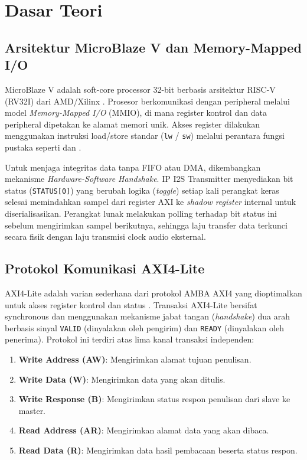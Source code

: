 \section{Dasar Teori}

\subsection{Arsitektur MicroBlaze V dan Memory-Mapped I/O}

MicroBlaze V adalah soft-core processor 32-bit berbasis arsitektur RISC-V (RV32I) dari AMD/Xilinx \citep{xilinx_microblaze_ref_2021}. Prosesor berkomunikasi dengan peripheral melalui model \textit{Memory-Mapped I/O} (MMIO), di mana register kontrol dan data peripheral dipetakan ke alamat memori unik. Akses register dilakukan menggunakan instruksi load/store standar (\texttt{lw} / \texttt{sw}) melalui perantara fungsi pustaka  seperti  dan . 

Untuk menjaga integritas data tanpa FIFO atau DMA, dikembangkan mekanisme \textit{Hardware-Software Handshake}. IP I2S Transmitter menyediakan bit status (\texttt{STATUS[0]}) yang berubah logika (\textit{toggle}) setiap kali perangkat keras selesai memindahkan sampel dari register AXI ke \textit{shadow register} internal untuk diserialisasikan. Perangkat lunak melakukan polling terhadap bit status ini sebelum mengirimkan sampel berikutnya, sehingga laju transfer data terkunci secara fisik dengan laju transmisi clock audio eksternal.

\subsection{Protokol Komunikasi AXI4-Lite}

AXI4-Lite adalah varian sederhana dari protokol AMBA AXI4 yang dioptimalkan untuk akses register kontrol dan status \citep{arm_amba_axi_2010}. Transaksi AXI4-Lite bersifat synchronous dan menggunakan mekanisme jabat tangan (\textit{handshake}) dua arah berbasis sinyal \texttt{VALID} (dinyalakan oleh pengirim) dan \texttt{READY} (dinyalakan oleh penerima). Protokol ini terdiri atas lima kanal transaksi independen:
\begin{enumerate}
    \item \textbf{Write Address (AW)}: Mengirimkan alamat tujuan penulisan.
    \item \textbf{Write Data (W)}: Mengirimkan data yang akan ditulis.
    \item \textbf{Write Response (B)}: Mengirimkan status respon penulisan dari slave ke master.
    \item \textbf{Read Address (AR)}: Mengirimkan alamat data yang akan dibaca.
    \item \textbf{Read Data (R)}: Mengirimkan data hasil pembacaan beserta status respon.
\end{enumerate}

